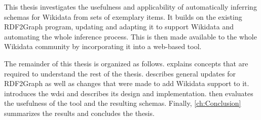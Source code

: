 This thesis investigates the usefulness and applicability
of automatically inferring \glspl{schema} for \gls{Wikidata} from sets of exemplary \glspl{item}.
It builds on the existing \gls{RDF2Graph} \cite{vanDam2015} program,
updating and adapting it to support \gls{Wikidata}
and automating the whole inference process.
This is then made available to the whole \gls{Wikidata} community
by incorporating it into a web-based tool.

The remainder of this thesis
is organized as follows.
 explains concepts that are required
to understand the rest of the thesis.
 describes general updates for \gls{RDF2Graph}
as well as changes that were made to add \gls{Wikidata} support to it.
 introduces the \gls{wdsi}
and describes its design and implementation.
 then evaluates the usefulness of the tool and the resulting \glspl{schema}.
Finally, \cref{ch:Conclusion} summarizes the results and concludes the thesis.
